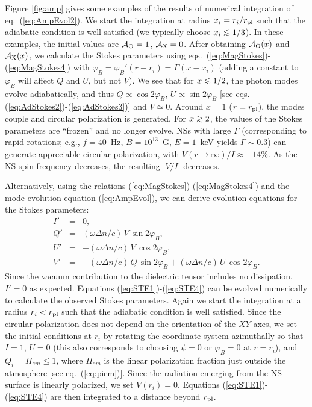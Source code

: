 \documentclass[useAMS,onecolumn,usenatbib,usegraphicx]{mn2e}
\def\go{\mathrel{\raise.3ex\hbox{$>$}\mkern-14mu\lower0.6ex\hbox{$\sim$}}}
\def\lo{\mathrel{\raise.3ex\hbox{$<$}\mkern-14mu\lower0.6ex\hbox{$\sim$}}}
\begin{document}
Figure \ref{fig:amp} 
gives some examples of the results of numerical integration
of eq.~(\ref{eq:AmpEvol2}). We start the integration at 
radius $x_i=r_i/r_{\rm pl}$ such that the adiabatic condition is well
satisfied (we typically choose $x_i\lo 1/3$). In these examples,
the initial values are ${\cal A}_{\rm O}=1$, ${\cal A}_{\rm X}=0$.
After obtaining ${\cal A}_{\rm O}(x)$ and ${\cal A}_{\rm X}(x)$, we calculate
the Stokes parameters using eqs.~(\ref{eq:MagStokes})-(\ref{eq:MagStokes4})
with $\varphi_B=\varphi_B'(r-r_i)=\Gamma (x-x_i)$
(adding a constant to $\varphi_B$ will affect $Q$ and $U$,
but not $V$). We see that for $x\lo 1/2$,
the photon modes evolve adiabatically, and thus $Q\propto
\cos 2\varphi_B$, $U\propto \sin 2\varphi_B$ [see eqs.~
(\ref{eq:AdStokes2})-(\ref{eq:AdStokes3})] and $V\simeq 0$.  Around
$x=1$ ($r=r_{\rm pl}$), the modes couple and circular polarization is generated.
For $x\go 2$, the values of the Stokes parameters are
``frozen'' and no longer evolve. NSs with large $\Gamma$
(corresponding to rapid rotations; e.g., $f=40$~Hz, $B=10^{13}$~G, $E=1$~keV
yields $\Gamma\sim 0.3$) can generate
appreciable circular polarization, with $V(r\rightarrow\infty)/I
\approx -14\%$. As the NS spin frequency decreases, the resulting
$|V/I|$ decreases.

Alternatively, using the relations 
(\ref{eq:MagStokes})-(\ref{eq:MagStokes4}) and the mode 
evolution equation (\ref{eq:AmpEvol}), we can derive
evolution equations for the Stokes parameters:
\begin{eqnarray}
\label{eq:STE1}
I' & = & 0,\\
\label{eq:STE2}
Q' & = & (\omega\Delta n/c) \,V\, \sin 2\varphi_B,\\
U' & = & -(\omega\Delta n/c) \,V\, \cos 2\varphi_B,\\
\label{eq:STE4}
V' & = & -(\omega\Delta n/c) \,Q\,\sin 2\varphi_B + (\omega\Delta n/c)\,
U\,\cos 2\varphi_B.
\end{eqnarray}
Since the vacuum contribution to the dielectric tensor includes no
dissipation, $I'=0$ as expected.
Equations (\ref{eq:STE1})-(\ref{eq:STE4}) can be evolved
numerically to calculate the observed Stokes parameters.
Again we start the integration at a
radius $r_i<r_{\rm pl}$ such that the adiabatic condition is well
satisfied. Since the circular polarization does not depend on the 
orientation of the $XY$ axes, we set the initial conditions at $r_i$ 
by rotating the coordinate system azimuthally so that $I=1$, $U=0$ (this also
corresponds to choosing $\psi=0$ or $\varphi_B=0$ at $r=r_i$),
and $Q_i=\Pi_{em}\le 1$, where $\Pi_{em}$ is the linear polarization
fraction just outside the atmosphere [see eq.~(\ref{eq:piem})].  Since
the radiation emerging from the NS surface is linearly polarized, we
set $V(r_i)=0$. Equations (\ref{eq:STE1})-(\ref{eq:STE4}) are then
integrated to a distance beyond $r_{\rm pl}$. 
\end{document}
